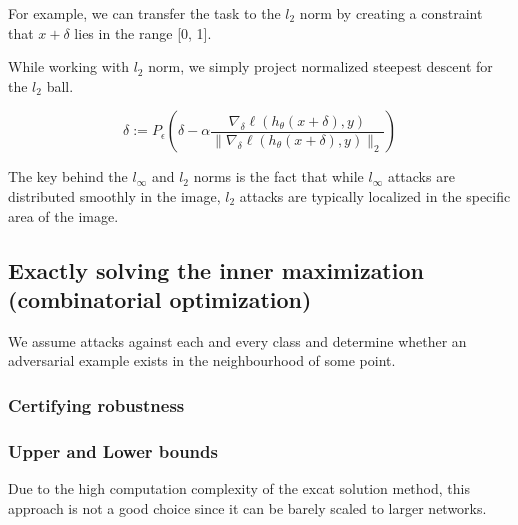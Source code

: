 For example, we can transfer the task to the $l_2$ norm by creating a constraint that $x+\delta$ lies in the range [0, 1].

While working with $l_2$ norm, we simply project normalized steepest descent for the $l_2$ ball. 

\[\delta := P_{\epsilon}\left(\delta - \alpha \frac{\nabla_{\delta} \ell(h_{\theta}(x + \delta), y)}{\|\nabla_{\delta} \ell(h_{\theta}(x + \delta), y)\|_2}\right)\]

The key behind the $l_\infty$ and $l_2$ norms is the fact that while $l_\infty$ attacks are distributed smoothly in the image, 
$l_2$ attacks are typically localized in the specific area of the image. 




\subsection{Exactly solving the inner maximization (combinatorial optimization)}

We assume attacks against each and every class and determine whether an adversarial example exists in the neighbourhood of some point.

\subsubsection{Certifying robustness}




\subsubsection{Upper and Lower bounds}

Due to the high computation complexity of the excat solution method, this approach is not a good choice since it can be barely scaled to larger networks. 


